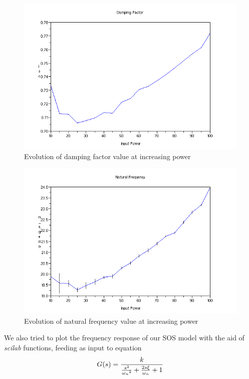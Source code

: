 \begin{figure}[htbp]
\center
  \includegraphics[scale=0.65]{FIGURES_1/DampingFactor.png}
  \caption{Evolution of damping factor value at increasing power}
  \label{fig:csi_avg}
\end{figure}

\begin{figure}[htbp]
\center
  \includegraphics[scale=0.65]{FIGURES_1/NaturalFrequency.png}
  \caption{Evolution of natural frequency value at increasing power}
  \label{fig:omega_n_avg}
\end{figure}

We also tried to plot the frequency response of our SOS model with the aid of \textit{scilab} functions, feeding as input to equation 
\[
  G(s) = {{k \over {{s^2 \over {{\omega_n}^2}} + {2s{\xi} \over
        {\omega_n}} + 1}}}
\]

